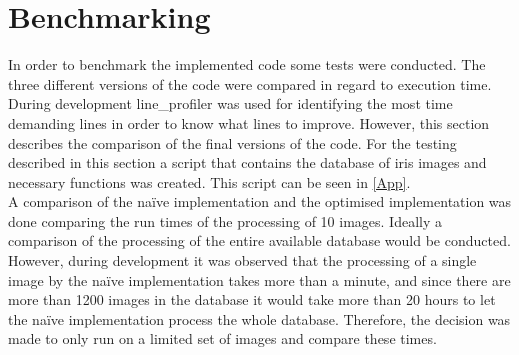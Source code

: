 \section{Benchmarking}
In order to benchmark the implemented code some tests were conducted. The three different versions of the code were compared in regard to execution time. During development line_profiler was used for identifying the most time demanding lines in order to know what lines to improve. However, this section describes the comparison of the final versions of the code. For the testing described in this section a script that contains the database of iris images and necessary functions was created. This script can be seen in \autoref{App}. \\
A comparison of the na\"ive implementation and the optimised implementation was done comparing the run times of the processing of 10 images. Ideally a comparison of the processing of the entire available database would be conducted. However, during development it was observed that the processing of a single image by the na\"ive implementation takes more than a minute, and since there are more than 1200 images in the database it would take more than 20 hours to let the na\"ive implementation process the whole database. Therefore, the decision was made to only run on a limited set of images and compare these times. \\
